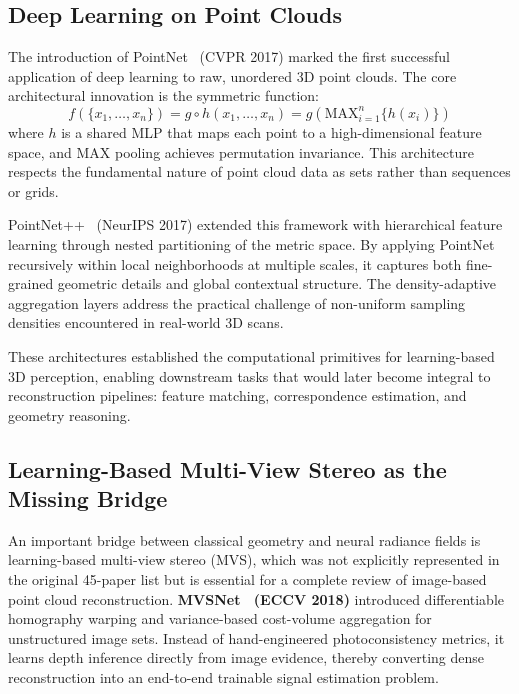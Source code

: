 \documentclass[journal]{IEEEtran}
\begin{document}
\subsection{Deep Learning on Point Clouds}

The introduction of PointNet~\cite{pointnet} (CVPR 2017) marked the first successful application of deep learning to raw, unordered 3D point clouds. The core architectural innovation is the symmetric function:
\begin{equation}
f(\{x_1,\dots,x_n\}) = g \circ h(x_1,\dots,x_n) = g(\text{MAX}_{i=1}^n \{h(x_i)\})
\end{equation}
where $h$ is a shared MLP that maps each point to a high-dimensional feature space, and MAX pooling achieves permutation invariance. This architecture respects the fundamental nature of point cloud data as sets rather than sequences or grids.

PointNet++~\cite{pointnet++} (NeurIPS 2017) extended this framework with hierarchical feature learning through nested partitioning of the metric space. By applying PointNet recursively within local neighborhoods at multiple scales, it captures both fine-grained geometric details and global contextual structure. The density-adaptive aggregation layers address the practical challenge of non-uniform sampling densities encountered in real-world 3D scans.

These architectures established the computational primitives for learning-based 3D perception, enabling downstream tasks that would later become integral to reconstruction pipelines: feature matching, correspondence estimation, and geometry reasoning.

\subsection{Learning-Based Multi-View Stereo as the Missing Bridge}

An important bridge between classical geometry and neural radiance fields is learning-based multi-view stereo (MVS), which was not explicitly represented in the original 45-paper list but is essential for a complete review of image-based point cloud reconstruction. \textbf{MVSNet~\cite{mvsnet} (ECCV 2018)} introduced differentiable homography warping and variance-based cost-volume aggregation for unstructured image sets. Instead of hand-engineered photoconsistency metrics, it learns depth inference directly from image evidence, thereby converting dense reconstruction into an end-to-end trainable signal estimation problem.
\end{document}
